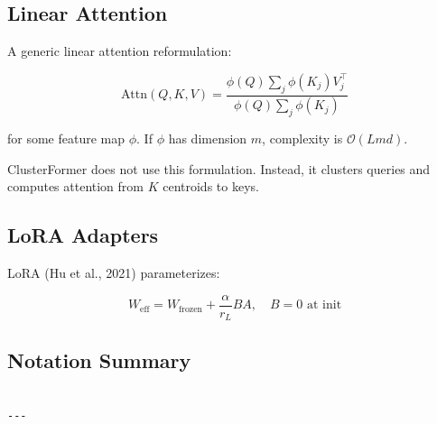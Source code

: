 \subsection{Linear Attention}

A generic linear attention reformulation:

\[
\text{Attn}(Q, K, V) = \frac{\phi(Q) \sum_j \phi(K_j) V_j^\top}{\phi(Q) \sum_j \phi(K_j)}
\]

for some feature map $\phi$. If $\phi$ has dimension $m$, complexity is 
$\mathcal{O}(L m d)$.

ClusterFormer does not use this formulation. Instead, it clusters queries 
and computes attention from $K$ centroids to keys.

\subsection{LoRA Adapters}

LoRA (Hu et al., 2021) parameterizes:

\[
W_\text{eff} = W_\text{frozen} + \frac{\alpha}{r_L} B A, \quad B = 0 \text{ at init}
\]

\subsection{Notation Summary}

\begin{lstlisting}

---
\end{lstlisting}